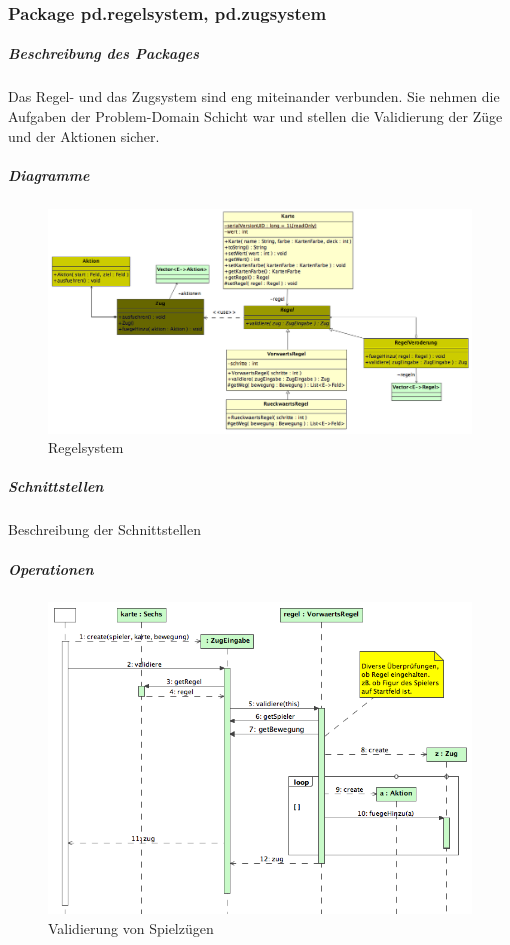 \documentclass[a4paper,12pt,halfparskip,DIV14]{scrartcl}
\begin{document}
\newpage
\subsubsection{Package pd.regelsystem, pd.zugsystem} %
\label{ssub:package_pd_regelsystem}
\subparagraph{Beschreibung des Packages} %
\label{ssub:beschreibung_des_packages}
Das Regel- und das Zugsystem sind eng miteinander verbunden. Sie nehmen die Aufgaben der Problem-Domain Schicht war und stellen die Validierung der Züge und der Aktionen sicher.
\subparagraph{Diagramme} %
\label{ssub:diagramme}
\begin{figure}
	[htp] \centering 
	\includegraphics[width=1\textwidth]{pd_regelsystem.png} \caption{Regelsystem}\label{fig:pd_regelsystem.png} 
\end{figure}
\subparagraph{Schnittstellen} %
\label{ssub:schnittstellen}
Beschreibung der Schnittstellen
\subparagraph{Operationen} %
\label{ssub:operationen}
\begin{figure}
	[htp] \centering 
	\includegraphics[width=1\textwidth]{pd_validierung.png} \caption{Validierung von Spielzügen}\label{fig:pd_validierung.png} 
\end{figure}
\end{document}
